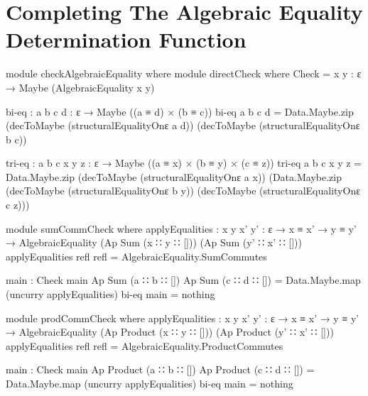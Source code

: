 \documentclass{report}
\begin{document}

\section{Completing The Algebraic Equality Determination Function}

\begin{code}
  module checkAlgebraicEquality where
    module directCheck where
      Check = {x y : ε} → Maybe (AlgebraicEquality x y)

      bi-eq : {a b c d : ε} → Maybe ((a ≡ d) × (b ≡ c))
      bi-eq {a} {b} {c} {d} =
        Data.Maybe.zip (decToMaybe (structuralEqualityOnε a d))
                       (decToMaybe (structuralEqualityOnε b c))

      tri-eq : {a b c x y z : ε} →
               Maybe ((a ≡ x) × (b ≡ y) × (c ≡ z))
      tri-eq {a} {b} {c} {x} {y} {z} =
        Data.Maybe.zip (decToMaybe (structuralEqualityOnε a x))
                       (Data.Maybe.zip (decToMaybe (structuralEqualityOnε b y))
                                       (decToMaybe (structuralEqualityOnε c z)))

      module sumCommCheck where
        applyEqualities : {x y x' y' : ε} →
                          x ≡ x' →
                          y ≡ y' →
                          AlgebraicEquality (Ap Sum (x ∷ y ∷ []))
                                            (Ap Sum (y' ∷ x' ∷ []))
        applyEqualities refl refl = AlgebraicEquality.SumCommutes

        main : Check
        main {Ap Sum (a ∷ b ∷ [])} {Ap Sum (c ∷ d ∷ [])} =
          Data.Maybe.map (uncurry applyEqualities) bi-eq
        main = nothing

      module prodCommCheck where
        applyEqualities :
          {x y x' y' : ε} →
          x ≡ x' →
          y ≡ y' →
          AlgebraicEquality (Ap Product (x ∷ y ∷ []))
                            (Ap Product (y' ∷ x' ∷ []))
        applyEqualities refl refl = AlgebraicEquality.ProductCommutes

        main : Check
        main {Ap Product (a ∷ b ∷ [])} {Ap Product (c ∷ d ∷ [])} =
          Data.Maybe.map (uncurry applyEqualities) bi-eq
        main = nothing


\end{code}
\end{document}
